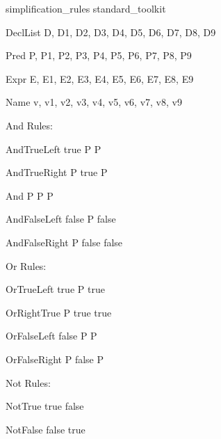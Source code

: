 \begin{zsection}
  \SECTION simplification\_rules \parents standard\_toolkit
\end{zsection}

\begin{zedjoker}{DeclList} D, D1, D2, D3, D4, D5, D6, D7, D8, D9 \end{zedjoker}
\begin{zedjoker}{Pred} P, P1, P2, P3, P4, P5, P6, P7, P8, P9 \end{zedjoker}
\begin{zedjoker}{Expr} E, E1, E2, E3, E4, E5, E6, E7, E8, E9 \end{zedjoker}
\begin{zedjoker}{Name} v, v1, v2, v3, v4, v5, v6, v7, v8, v9 \end{zedjoker}

And Rules:

\begin{zedrule}{AndTrueLeft}
  true \land P \iff P
\end{zedrule}

\begin{zedrule}{AndTrueRight}
  P \land true \iff P
\end{zedrule}

\begin{zedrule}{And}
  P \land P \iff P
\end{zedrule}

\begin{zedrule}{AndFalseLeft}
  false \land P \iff false
\end{zedrule}

\begin{zedrule}{AndFalseRight}
  P \land false \iff false
\end{zedrule}

Or Rules:

\begin{zedrule}{OrTrueLeft}
  true \lor P \iff true
\end{zedrule}

\begin{zedrule}{OrRightTrue}
  P \lor true \iff true
\end{zedrule}

\begin{zedrule}{OrFalseLeft}
  false \lor P \iff P
\end{zedrule}

\begin{zedrule}{OrFalseRight}
  P \lor false \iff P
\end{zedrule}

Not Rules:

\begin{zedrule}{NotTrue}
  \lnot true \iff false
\end{zedrule}

\begin{zedrule}{NotFalse}
  \lnot false \iff true
\end{zedrule}
